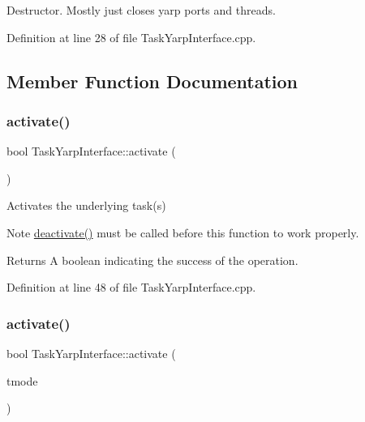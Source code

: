 Destructor. Mostly just closes yarp ports and threads. 

Definition at line 28 of file Task\+Yarp\+Interface.\+cpp.



\subsection{Member Function Documentation}
\hypertarget{classocra_1_1TaskYarpInterface_abf74ad0cab419197271b1d476522f0bf}{}\label{classocra_1_1TaskYarpInterface_abf74ad0cab419197271b1d476522f0bf} 
\subsubsection{\texorpdfstring{activate()}{activate()}\hspace{0.1cm}{\footnotesize\ttfamily [1/2]}}
{\footnotesize\ttfamily bool Task\+Yarp\+Interface\+::activate (\begin{DoxyParamCaption}{ }\end{DoxyParamCaption})}

Activates the underlying task(s) \begin{DoxyNote}{Note}
{\ttfamily \hyperlink{classocra_1_1TaskYarpInterface_a4189dabbbaf0e5efe338dfb94e506407}{deactivate()}} must be called before this function to work properly.
\end{DoxyNote}
\begin{DoxyReturn}{Returns}
A boolean indicating the success of the operation. 
\end{DoxyReturn}


Definition at line 48 of file Task\+Yarp\+Interface.\+cpp.

\hypertarget{classocra_1_1TaskYarpInterface_a787a849cd5abd30816d5f2a9abceb9d6}{}\label{classocra_1_1TaskYarpInterface_a787a849cd5abd30816d5f2a9abceb9d6} 
\subsubsection{\texorpdfstring{activate()}{activate()}\hspace{0.1cm}{\footnotesize\ttfamily [2/2]}}
{\footnotesize\ttfamily bool Task\+Yarp\+Interface\+::activate (\begin{DoxyParamCaption}\item[{const \hyperlink{namespaceocra_a2ed783528071ed7ee7a57d923637595f}{T\+A\+S\+K\+\_\+\+M\+O\+DE}}]{tmode }\end{DoxyParamCaption})}

